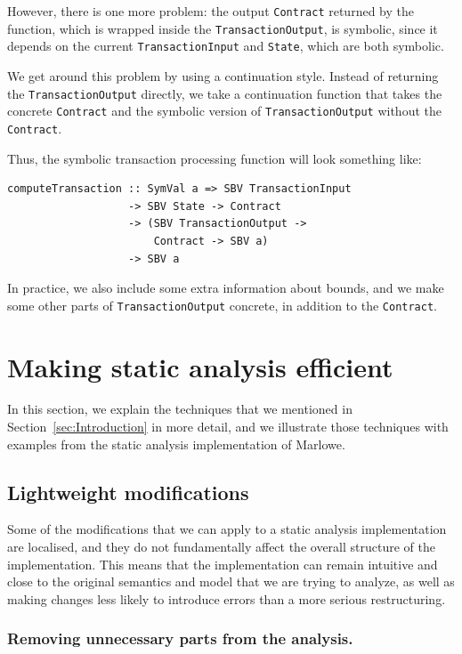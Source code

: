 \documentclass[english,runningheads]{llncs}
\begin{document}
However, there is one more problem: the output \texttt{Contract} returned
by the function, which is wrapped inside the \texttt{TransactionOutput},
is symbolic, since it depends on the current \texttt{TransactionInput}
and \texttt{State}, which are both symbolic.

We get around this problem by using a continuation style. Instead
of returning the \texttt{TransactionOutput} directly, we take a continuation
function that takes the concrete \texttt{Contract} and the symbolic version
of \texttt{TransactionOutput} without the \texttt{Contract}.

Thus, the symbolic transaction processing function will look something
like:

\begin{verbatim}
computeTransaction :: SymVal a => SBV TransactionInput
                   -> SBV State -> Contract
                   -> (SBV TransactionOutput ->
                       Contract -> SBV a)
                   -> SBV a
\end{verbatim}

In practice, we also include some extra information about bounds,
and we make some other parts of \texttt{TransactionOutput} concrete,
in addition to the \texttt{Contract}.

\section{Making static analysis efficient\label{sec:Making-static-analysis-efficient}}

In this section, we explain the techniques that we mentioned in Section~\ref{sec:Introduction}
in more detail, and we illustrate those techniques with examples from
the static analysis implementation of Marlowe.

\subsection{Lightweight modifications\label{subsec:Lightweight-modifications}}

Some of the modifications that we can apply to a static analysis implementation
are localised, and they do not fundamentally affect the overall structure
of the implementation. This means that the implementation can remain
intuitive and close to the original semantics and model that we are
trying to analyze, as well as making changes less likely to introduce
errors than a more serious restructuring.

\subsubsection{Removing unnecessary parts from the analysis.}
\end{document}

